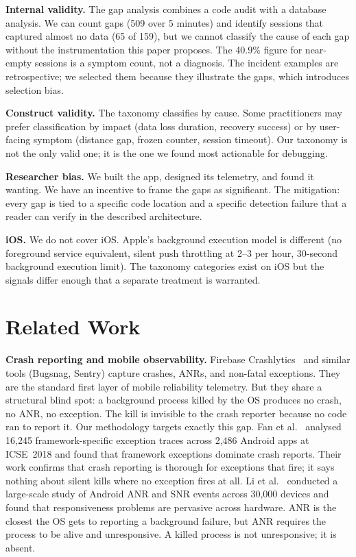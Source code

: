 \documentclass[10pt,journal,compsoc]{IEEEtran}
\begin{document}
\textbf{Internal validity.} The gap analysis combines a code audit with
a database analysis. We can count gaps (509 over 5 minutes) and identify
sessions that captured almost no data (65 of 159), but we cannot
classify the cause of each gap without the instrumentation this paper
proposes. The 40.9\% figure for near-empty sessions is a symptom count,
not a diagnosis. The incident examples are retrospective; we selected
them because they illustrate the gaps, which introduces selection bias.

\textbf{Construct validity.} The taxonomy classifies by cause. Some
practitioners may prefer classification by impact (data loss duration,
recovery success) or by user-facing symptom (distance gap, frozen
counter, session timeout). Our taxonomy is not the only valid one; it is
the one we found most actionable for debugging.

\textbf{Researcher bias.} We built the app, designed its telemetry,
and found it wanting. We have an incentive to frame the gaps as
significant. The mitigation: every gap is tied to a specific code
location and a specific detection failure that a reader can verify in
the described architecture.

\textbf{iOS.} We do not cover iOS. Apple's background execution model
is different (no foreground service equivalent, silent push throttling
at 2--3 per hour, 30-second background execution limit). The taxonomy
categories exist on iOS but the signals differ enough that a separate
treatment is warranted.


\section{Related Work}
\label{sec:related}

\textbf{Crash reporting and mobile observability.}
Firebase Crashlytics~\cite{firebase_crashlytics} and similar tools
(Bugsnag, Sentry) capture crashes, ANRs, and non-fatal exceptions.
They are the standard first layer of mobile reliability telemetry. But
they share a structural blind spot: a background process killed by the
OS produces no crash, no ANR, no exception. The kill is invisible to
the crash reporter because no code ran to report it. Our methodology
targets exactly this gap. Fan et al.~\cite{fan2018large} analysed
16,245 framework-specific exception traces across 2,486 Android apps
at ICSE~2018 and found that framework exceptions dominate crash reports.
Their work confirms that crash reporting is thorough for exceptions that
fire; it says nothing about silent kills where no exception fires at
all. Li et al.~\cite{li2020aging} conducted a large-scale study of
Android ANR and SNR events across 30,000 devices and found that
responsiveness problems are pervasive across hardware. ANR is the
closest the OS gets to reporting a background failure, but ANR requires
the process to be alive and unresponsive. A killed process is not
unresponsive; it is absent.
\end{document}

